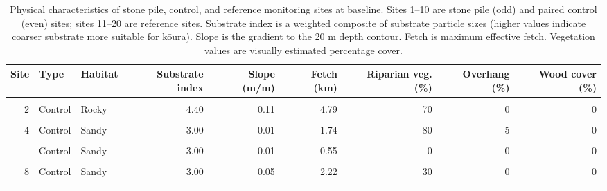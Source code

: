 \documentclass[
  12pt,
  a4paper,
  oneside]{scrbook}
\begin{document}
\begingroup\fontsize{8}{10}\selectfont

\begin{longtable}[t]{rllrrrrrr}

\caption{\label{tbl-site-overview}Physical characteristics of stone
pile, control, and reference monitoring sites at baseline. Sites 1--10
are stone pile (odd) and paired control (even) sites; sites 11--20 are
reference sites. Substrate index is a weighted composite of substrate
particle sizes (higher values indicate coarser substrate more suitable
for kōura). Slope is the gradient to the 20 m depth contour. Fetch is
maximum effective fetch. Vegetation values are visually estimated
percentage cover.}

\tabularnewline

\toprule
Site & Type & Habitat & Substrate index & Slope (m/m) & Fetch (km) & Riparian veg. (\%) & Overhang (\%) & Wood cover (\%)\\
\midrule
\cellcolor{gray!8}{1} & \cellcolor{gray!8}{Stone pile} & \cellcolor{gray!8}{Rocky} & \cellcolor{gray!8}{5.20} & \cellcolor{gray!8}{0.12} & \cellcolor{gray!8}{4.76} & \cellcolor{gray!8}{0} & \cellcolor{gray!8}{10} & \cellcolor{gray!8}{0}\\
2 & Control & Rocky & 4.40 & 0.11 & 4.79 & 70 & 0 & 0\\
\cellcolor{gray!8}{3} & \cellcolor{gray!8}{Stone pile} & \cellcolor{gray!8}{Sandy} & \cellcolor{gray!8}{3.00} & \cellcolor{gray!8}{0.01} & \cellcolor{gray!8}{1.71} & \cellcolor{gray!8}{100} & \cellcolor{gray!8}{0} & \cellcolor{gray!8}{0}\\
4 & Control & Sandy & 3.00 & 0.01 & 1.74 & 80 & 5 & 0\\
\cellcolor{gray!8}{5} & \cellcolor{gray!8}{Stone pile} & \cellcolor{gray!8}{Sandy} & \cellcolor{gray!8}{2.40} & \cellcolor{gray!8}{0.01} & \cellcolor{gray!8}{0.61} & \cellcolor{gray!8}{10} & \cellcolor{gray!8}{0} & \cellcolor{gray!8}{0}\\
\addlinespace
6 & Control & Sandy & 3.00 & 0.01 & 0.55 & 0 & 0 & 0\\
\cellcolor{gray!8}{7} & \cellcolor{gray!8}{Stone pile} & \cellcolor{gray!8}{Sandy} & \cellcolor{gray!8}{3.00} & \cellcolor{gray!8}{0.06} & \cellcolor{gray!8}{2.50} & \cellcolor{gray!8}{100} & \cellcolor{gray!8}{0} & \cellcolor{gray!8}{0}\\
8 & Control & Sandy & 3.00 & 0.05 & 2.22 & 30 & 0 & 0\\
\cellcolor{gray!8}{9} & \cellcolor{gray!8}{Stone pile} & \cellcolor{gray!8}{Sandy} & \cellcolor{gray!8}{3.35} & \cellcolor{gray!8}{0.08} & \cellcolor{gray!8}{3.59} & \cellcolor{gray!8}{0} & \cellcolor{gray!8}{0} & \cellcolor{gray!8}{3}\\

\end{longtable}
\end{document}
